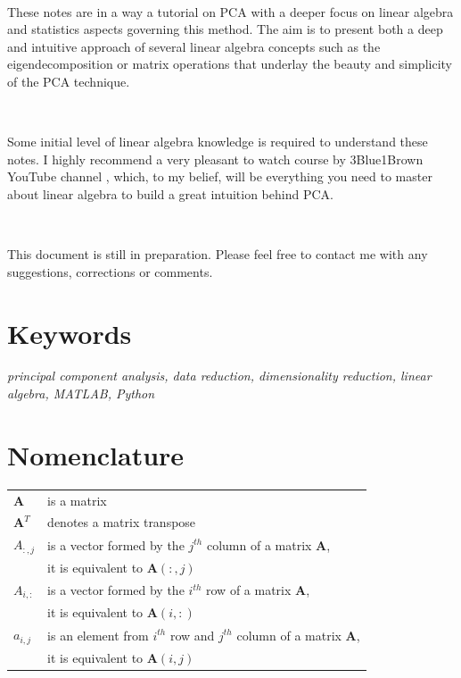 \documentclass[10pt,twocolumn]{article}
\begin{document}
\,\,

These notes are in a way a tutorial on PCA with a deeper focus on linear algebra and statistics aspects governing this method. The aim is to present both a deep and intuitive approach of several linear algebra concepts such as the eigendecomposition or matrix operations that underlay the beauty and simplicity of the PCA technique. 

\,\,

Some initial level of linear algebra knowledge is required to understand these notes. I highly recommend a very pleasant to watch course by 3Blue1Brown YouTube channel \cite{3Blue1Brown}, which, to my belief, will be everything you need to master about linear algebra to build a great intuition behind PCA.

\,\,

This document is still in preparation. Please feel free to contact me with any suggestions, corrections or comments.

\section*{Keywords}

\textit{principal component analysis, data reduction, dimensionality reduction, linear algebra, MATLAB\textregistered, Python}

\tableofcontents

\section{Nomenclature}

\begin{tabular}{ll}
    $\bm{A}$ & is a matrix \\
     $\bm{A}^T$ & denotes a matrix transpose \\
    $A_{:,j}$ & is a vector formed by the $j^{th}$ column of a matrix $\bm{A}$, \\
    & it is equivalent to  $\bm{A}(:,j)$ \\
    $A_{i,:}$ & is a vector formed by the $i^{th}$ row of a matrix $\bm{A}$, \\
    & it is equivalent to  $\bm{A}(i,:)$ \\
    $a_{i,j}$ & is an element from $i^{th}$ row and $j^{th}$ column of a matrix $\bm{A}$, \\ 
    & it is equivalent to  $\bm{A}(i,j)$ \\
\end{tabular}
\end{document}
